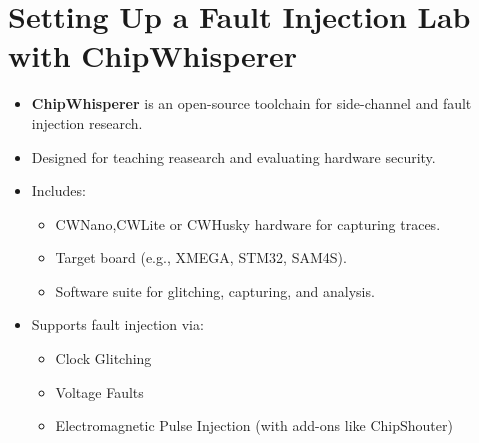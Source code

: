 \documentclass{beamer}
\newenvironment{tres important}[2][]{
	\setkeys{EmphEqEnv}{#2}
	\setkeys{EmphEqOpt}{box={\setlength{\fboxsep}{10pt}\fcolorbox{myNewColorA}{white}},#1}
	\EmphEqMainEnv}
{\endEmphEqMainEnv}
\begin{document}
\section{Setting Up a Fault Injection Lab with ChipWhisperer}

\begin{frame}

  \begin{itemize}
    \item \textbf{ChipWhisperer} is an open-source toolchain for side-channel and fault injection research.
    \item Designed for teaching reasearch and evaluating hardware security.
    \item Includes:
    \begin{itemize}
        \item CWNano,CWLite or CWHusky hardware for capturing traces.
        \item Target board (e.g., XMEGA, STM32, SAM4S).
        \item Software suite for glitching, capturing, and analysis.
    \end{itemize}
    \item Supports fault injection via:
    \begin{itemize}
        \item Clock Glitching
        \item Voltage Faults
        \item Electromagnetic Pulse Injection (with add-ons like ChipShouter)
    \end{itemize}
  \end{itemize}
\end{frame}
\end{document}
